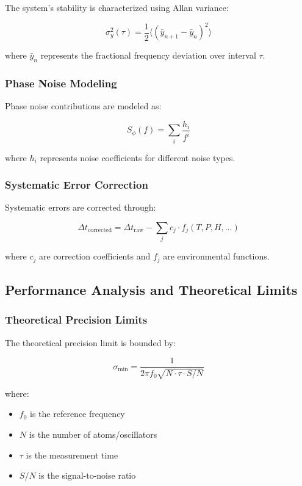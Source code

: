 \documentclass[12pt,a4paper]{article}
\begin{document}
{The system's stability is characterized using Allan variance:

\begin{equation}
\sigma_y^2(\tau) = \frac{1}{2} \langle (\bar{y}_{n+1} - \bar{y}_n)^2 \rangle
\end{equation}

where $\bar{y}_n$ represents the fractional frequency deviation over interval $\tau$.

\subsubsection{Phase Noise Modeling}

Phase noise contributions are modeled as:

\begin{equation}
S_\phi(f) = \sum_{i} \frac{h_i}{f^i}
\end{equation}

where $h_i$ represents noise coefficients for different noise types.

\subsubsection{Systematic Error Correction}

Systematic errors are corrected through:

\begin{equation}
\Delta t_{\text{corrected}} = \Delta t_{\text{raw}} - \sum_{j} c_j \cdot f_j(T, P, H, \ldots)
\end{equation}

where $c_j$ are correction coefficients and $f_j$ are environmental functions.

\subsection{Performance Analysis and Theoretical Limits}

\subsubsection{Theoretical Precision Limits}

The theoretical precision limit is bounded by:

\begin{equation}
\sigma_{\text{min}} = \frac{1}{2\pi f_0 \sqrt{N \cdot \tau \cdot S/N}}
\end{equation}

where:
\begin{itemize}
\item $f_0$ is the reference frequency
\item $N$ is the number of atoms/oscillators
\item $\tau$ is the measurement time
\item $S/N$ is the signal-to-noise ratio
\end{itemize}

}
\end{document}
